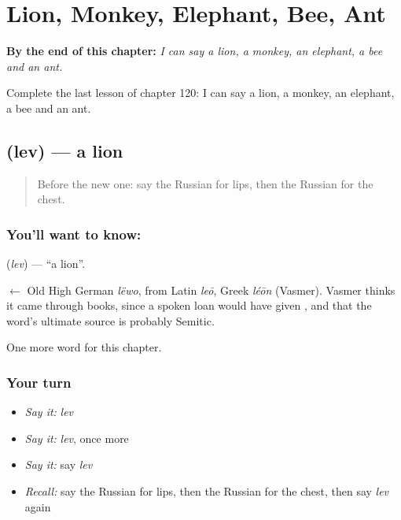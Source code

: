 
\chapter{Lion, Monkey, Elephant, Bee, Ant}
\label{ch:ru-lion-monkey-elephant-bee-ant}

\begin{chapteropening}
\textbf{By the end of this chapter:} \emph{I can say a lion, a monkey, an elephant, a bee and an ant.}

Complete the last lesson of chapter 120: I can say a lion, a monkey, an elephant, a bee and an ant.
\end{chapteropening}

\section[\texorpdfstring{\ru{лев} (lev)}{лев (lev)}]{ (lev) — a lion}

\label{lesson:RU-C120-lion}



\begin{quote}
Before the new one: say the Russian for lips, then the Russian for the chest.
\end{quote}

\subsection*{You'll want to know: }
\textbf{} (\emph{lev}) — \textquotedblleft{}a lion\textquotedblright{}.

\begin{cousinweb}
\textbf{} $\leftarrow$ Old High German \emph{lëwo}, from Latin \emph{leō}, Greek \emph{léōn} (Vasmer). Vasmer thinks it came through books, since a spoken loan would have given \emph{}, and that the word's ultimate source is probably Semitic.
\end{cousinweb}

\begin{grammarlens}[title={What you've built}]
One more word for this chapter.
\end{grammarlens}

\subsection*{Your turn}
\begin{itemize}
\raggedright
  \item \emph{Say it:} \emph{lev}
  \item \emph{Say it:} \emph{lev}, once more
  \item \emph{Say it:} say \emph{lev}
  \item \emph{Recall:} say the Russian for lips, then the Russian for the chest, then say \emph{lev} again
\end{itemize}

